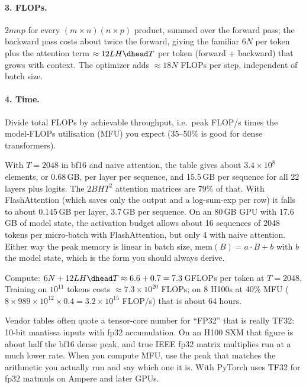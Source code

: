\paragraph{3. FLOPs.} $2mnp$ for every $(m\times n)(n\times p)$ product, summed over the forward
pass; the backward pass costs about twice the forward, giving the familiar $6N$ per token plus
the attention term $\approx 12 L H \dhead T$ per token (forward + backward) that grows with
context. The optimizer adds $\approx18N$ FLOPs per step, independent of batch size.

\paragraph{4. Time.} Divide total FLOPs by achievable throughput, i.e.\ peak FLOP/s times the
model-FLOPs utilisation (MFU) you expect (35--50\% is good for dense transformers).

\begin{napkinmath}
With $T=2048$ in bf16 and naive attention, the table gives about $3.4\times10^8$ elements, or
0.68\,GB, per layer per sequence, and 15.5\,GB per sequence for all 22 layers plus logits. The
$2BHT^2$ attention matrices are 79\% of that. With FlashAttention (which saves only the output
and a log-sum-exp per row) it falls to about 0.145\,GB per layer, 3.7\,GB per sequence. On an
80\,GB GPU with 17.6\,GB of model state, the activation budget allows about 16 sequences of 2048
tokens per micro-batch with FlashAttention, but only 4 with naive attention. Either way the
peak memory is linear in batch size, $\text{mem}(B) = a\cdot B + b$ with $b$ the model state, which is the form you should always
derive.

Compute: $6N + 12LH\dhead T \approx 6.6 + 0.7 = 7.3$\,GFLOPs per token at $T=2048$. Training on
$10^{11}$ tokens costs $\approx 7.3\times10^{20}$ FLOPs; on 8 H100s at 40\% MFU
($8\times 989\times10^{12}\times0.4 = 3.2\times10^{15}$ FLOP/s) that is about 64 hours.
\end{napkinmath}

\begin{pitfall}
Vendor tables often quote a tensor-core number for ``FP32'' that is really TF32: 10-bit
mantissa inputs with fp32 accumulation. On an H100 SXM that figure is about half the bf16 dense
peak, and true IEEE fp32 matrix multiplies run at a much lower rate. When you compute MFU, use
the peak that matches the arithmetic you actually run and say which one it is. With
 PyTorch uses TF32 for fp32 matmuls on Ampere
and later GPUs.
\end{pitfall}

